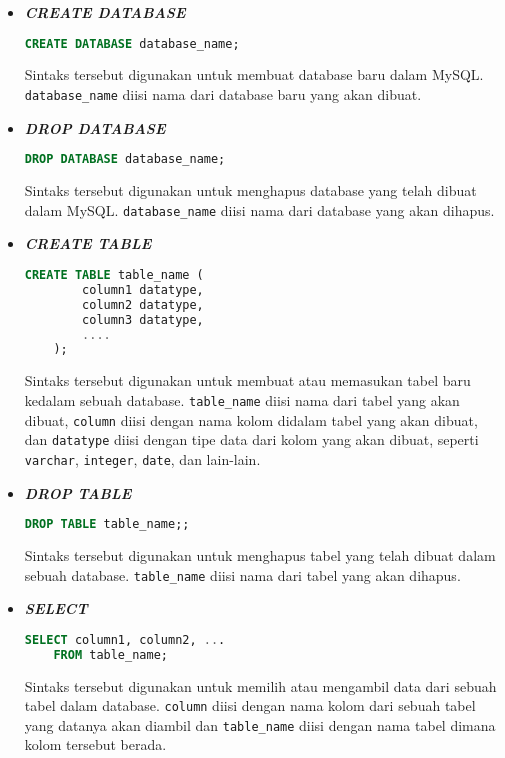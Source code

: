 \begin{itemize}
    \item \textbf{\textit{CREATE DATABASE}}
    \begin{lstlisting}[language=SQL]
    CREATE DATABASE database_name;
    \end{lstlisting}
    Sintaks tersebut digunakan untuk membuat database baru dalam MySQL. \texttt{database\_name} diisi nama dari database baru yang akan dibuat.
    \item \textbf{\textit{DROP DATABASE}}
    \begin{lstlisting}[language=SQL]
    DROP DATABASE database_name;
    \end{lstlisting}
    Sintaks tersebut digunakan untuk menghapus database yang telah dibuat dalam MySQL. \texttt{database\_name} diisi nama dari database yang akan dihapus.
    
    \item \textbf{\textit{CREATE TABLE}}
    \begin{lstlisting}[language=SQL]
    CREATE TABLE table_name (
        column1 datatype,
        column2 datatype,
        column3 datatype,
        ....
    );
    \end{lstlisting}
    Sintaks tersebut digunakan untuk membuat atau memasukan tabel baru kedalam sebuah database. \texttt{table\_name} diisi nama dari tabel yang akan dibuat, \texttt{column} diisi dengan nama kolom didalam tabel yang akan dibuat, dan \texttt{datatype} diisi dengan tipe data dari kolom yang akan dibuat, seperti \texttt{varchar}, \texttt{integer}, \texttt{date}, dan lain-lain.

    \item \textbf{\textit{DROP TABLE}}
    \begin{lstlisting}[language=SQL]
    DROP TABLE table_name;;
    \end{lstlisting}
    Sintaks tersebut digunakan untuk menghapus tabel yang telah dibuat dalam sebuah database. \texttt{table\_name} diisi nama dari tabel yang akan dihapus.

    \item \textbf{\textit{SELECT}}
    \begin{lstlisting}[language=SQL]
    SELECT column1, column2, ...
    FROM table_name;
    \end{lstlisting}
    Sintaks tersebut digunakan untuk memilih atau mengambil data dari sebuah tabel dalam database. \texttt{column} diisi dengan nama kolom dari sebuah tabel yang datanya akan diambil dan \texttt{table\_name} diisi dengan nama tabel dimana kolom tersebut berada.


\end{itemize}
